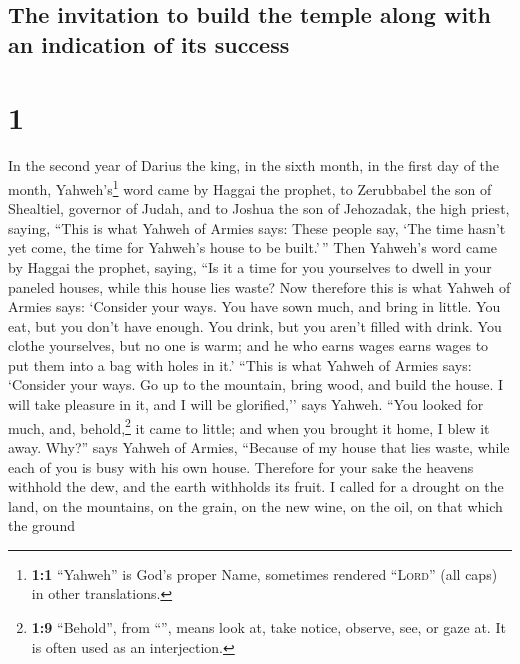\hypertarget{the-invitation-to-build-the-temple-along-with-an-indication-of-its-success}{%
\subsection{The invitation to build the temple along with an indication
of its
success}\label{the-invitation-to-build-the-temple-along-with-an-indication-of-its-success}}

\hypertarget{section}{%
\section{1}\label{section}}

 In the second year of Darius the king, in the sixth
month, in the first day of the month, Yahweh's\footnote{\textbf{1:1}
  ``Yahweh'' is God's proper Name, sometimes rendered ``\textsc{Lord}''
  (all caps) in other translations.} word came by Haggai the prophet, to
Zerubbabel the son of Shealtiel, governor of Judah, and to Joshua the
son of Jehozadak, the high priest, saying,  ``This is what
Yahweh of Armies says: These people say, `The time hasn't yet come, the
time for Yahweh's house to be built.'\,''  Then Yahweh's
word came by Haggai the prophet, saying,  ``Is it a time
for you yourselves to dwell in your paneled houses, while this house
lies waste?  Now therefore this is what Yahweh of Armies
says: `Consider your ways.  You have sown much, and bring
in little. You eat, but you don't have enough. You drink, but you aren't
filled with drink. You clothe yourselves, but no one is warm; and he who
earns wages earns wages to put them into a bag with holes in it.'
 ``This is what Yahweh of Armies says: `Consider your
ways.  Go up to the mountain, bring wood, and build the
house. I will take pleasure in it, and I will be glorified,'' says
Yahweh.  ``You looked for much, and, behold,\footnote{\textbf{1:9}
  ``Behold'', from ``'', means look at, take notice,
  observe, see, or gaze at. It is often used as an interjection.} it
came to little; and when you brought it home, I blew it away. Why?''
says Yahweh of Armies, ``Because of my house that lies waste, while each
of you is busy with his own house.  Therefore for your
sake the heavens withhold the dew, and the earth withholds its fruit.
 I called for a drought on the land, on the mountains, on
the grain, on the new wine, on the oil, on that which the ground
